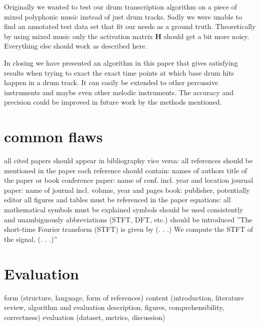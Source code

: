 \documentclass{article}
\begin{document}
Originally we wanted to test our drum transcription algorithm on a piece of mixed polyphonic music instead of just drum tracks.
Sadly we were unable to find an annotated test data set that fit our needs as a ground truth.
Theoretically by using mixed music only the activation matrix $\mathbf{H}$ should get a bit more noisy.
Everything else should work as described here.

In closing we have presented an algorithm in this paper that gives satisfying results when trying to exact the exact time points at which base drum hits happen in a drum track.
It can easily be extended to other percussive instruments and maybe even other melodic instruments.
The accuracy and precision could be improved in future work by the methods mentioned.









\vfill\pagebreak

\section{common flaws}
all cited papers should appear in bibliography
vice versa: all references should be mentioned in the paper
each reference should contain:
names of authors
title of the paper or book
conference paper: name of conf. incl. year and location
journal paper: name of journal incl. volume, year and pages
book: publisher, potentially editor
all figures and tables must be referenced in the paper
equations:
all mathematical symbols must be explained
symbols should be used consistently and unambiguously
abbreviations (STFT, DFT, etc.) should be introduced
”The short-time Fourier transform (STFT) is given by (. . .)
We compute the STFT of the signal, (. . .)”

\section{Evaluation}

form (structure, language, form of references)
content (introduction, literature review, algorithm and
evaluation description, figures, comprehensibility, correctness)
evaluation (dataset, metrics, discussion)
\end{document}
